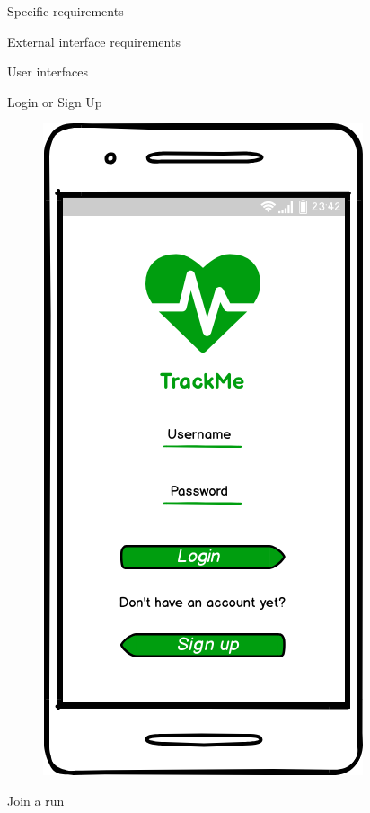 \documentclass{article}
\begin{document}
\begin{legal}
\newpage
	\item Specific requirements\\
  		\begin{legal}
		\item External interface requirements\\
			\begin{legal}
    			\item User interfaces \\
				\begin{legal}
    				\item Login or Sign Up 
				\begin{figure}[H]
				\centering
  				\includegraphics[scale=0.3]{./images/mockups/Login-Sign-up.png}
				\end{figure}
				\item Join a run 
				\begin{figure}[H]

\end{figure}
\end{legal}
\end{legal}
\end{legal}
\end{legal}
\end{document}
